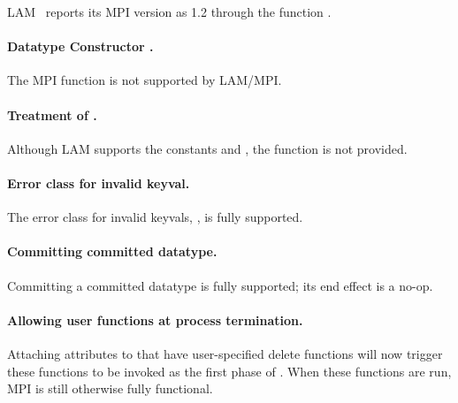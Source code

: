 LAM \lamversion\ reports its MPI version as 1.2 through the function
.


\paragraph{Datatype Constructor .}

The MPI function 
is not supported by LAM/MPI.


\paragraph{Treatment of .}

Although LAM supports the constants 
and , the function
 is not provided.


\paragraph{Error class for invalid keyval.}

The error class for invalid keyvals, ,
is fully supported.


\paragraph{Committing committed datatype.}

Committing a committed datatype is fully supported; its end effect is
a no-op.


\paragraph{Allowing user functions at process termination.}

Attaching attributes to  that have
user-specified delete functions will now trigger these functions to be
invoked as the first phase of .  When these
functions are run, MPI is still otherwise fully functional.


